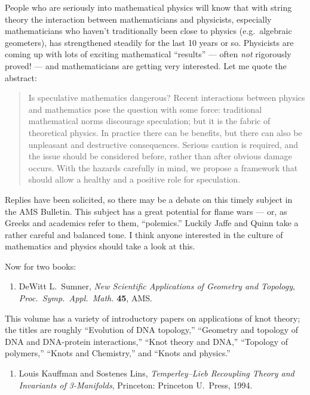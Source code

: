 \documentclass[12pt]{article}
\def\tightlist{}
\begin{document}
People who are seriously into mathematical physics will know that with
string theory the interaction between mathematicians and physicists,
especially mathematicians who haven't traditionally been close to
physics (e.g.~algebraic geometers), has strengthened steadily for the
last 10 years or so. Physicists are coming up with lots of exciting
mathematical ``results'' --- often \emph{not} rigorously proved! --- and
mathematicians are getting very interested. Let me quote the abstract:

\begin{quote}
Is speculative mathematics dangerous? Recent interactions between
physics and mathematics pose the question with some force: traditional
mathematical norms discourage speculation; but it is the fabric of
theoretical physics. In practice there can be benefits, but there can
also be unpleasant and destructive consequences. Serious caution is
required, and the issue should be considered before, rather than after
obvious damage occurs. With the hazards carefully in mind, we propose a
framework that should allow a healthy and a positive role for
speculation.
\end{quote}

Replies have been solicited, so there may be a debate on this timely
subject in the AMS Bulletin. This subject has a great potential for
flame wars --- or, as Greeks and academics refer to them, ``polemics.''
Luckily Jaffe and Quinn take a rather careful and balanced tone. I think
anyone interested in the culture of mathematics and physics should take
a look at this.

Now for two books:

\begin{enumerate}
\def\labelenumi{\arabic{enumi})}
\setcounter{enumi}{1}
\tightlist
\item
  DeWitt L.\ Sumner, \emph{New Scientific Applications of Geometry and Topology},
   \emph{Proc.\ Symp.\ Appl.\ Math.} \textbf{45}, AMS.
\end{enumerate}

This volume has a variety of introductory papers on applications of knot
theory; the titles are roughly ``Evolution of DNA topology,'' ``Geometry
and topology of DNA and DNA-protein interactions,'' ``Knot theory and
DNA,'' ``Topology of polymers,'' ``Knots and Chemistry,'' and ``Knots
and physics.''

\begin{enumerate}
\def\labelenumi{\arabic{enumi})}
\setcounter{enumi}{2}
\tightlist
\item
  Louis Kauffman and Sostenes Lins, \emph{Temperley--Lieb Recoupling Theory and 
  Invariants of 3-Manifolds}, Princeton: Princeton U.\ Press, 1994.
\end{enumerate}
\end{document}
